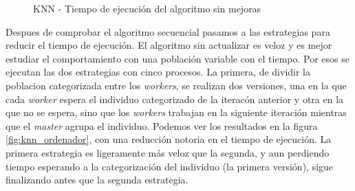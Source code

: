 			\newpage
		

			\begin{figure}[!h]
				\centering
				\caption{KNN - Tiempo de ejecución del algoritmo sin mejoras }
				\label{fig:knn_secuencial}
			\end{figure}

			
		
			Despues de comprobar el algoritmo secuencial pasamos a las estrategias para reducir el tiempo de ejecución. El algoritmo sin actualizar es veloz y es mejor estudiar el comportamiento con una población variable con el tiempo. Por esos se ejecutan las dos estrategias con cinco procesos. La primera, de dividir la poblacion categorizada entre los \textit{workers}, se realizan dos versiones, una en la que cada \textit{worker} espera el individuo categorizado de la iteracón anterior y otra en la que no se espera, sino que los \textit{workers} trabajan en la siguiente iteración mientras que el \textit{master} agrupa el individuo. Podemos ver los resultados en la figura \ref{fig:knn_ordenador}, con una reducción notoria en el tiempo de ejecución. La primera estrategia es ligeramente más veloz que la segunda, y aun perdiendo tiempo esperando a la categorización del individuo (la primera versión), sigue finalizando antes que la segunda estrategia. 
			

